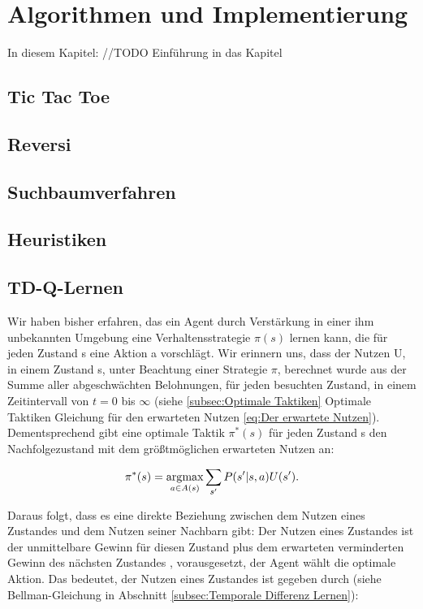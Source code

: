 \chapter{Algorithmen und Implementierung}
\label{cha:Algorithmen und Implementierung}

In diesem Kapitel: //TODO Einführung in das Kapitel

\section{Tic Tac Toe}

\section{Reversi}

\section{Suchbaumverfahren}

\section{Heuristiken}

\section{TD-Q-Lernen}

Wir haben bisher erfahren, das ein Agent durch Verstärkung in einer ihm unbekannten Umgebung eine Verhaltensstrategie $\pi(s)$ lernen kann, die für jeden Zustand s eine Aktion a vorschlägt. Wir erinnern uns, dass der Nutzen U, in einem Zustand s, unter Beachtung einer Strategie $\pi$, berechnet wurde aus der Summe aller abgeschwächten Belohnungen, für jeden besuchten Zustand, in einem Zeitintervall von $t = 0$ bis $\infty$ (siehe \ref{subsec:Optimale Taktiken} Optimale Taktiken Gleichung für den erwarteten Nutzen \ref{eq:Der erwartete Nutzen}). Dementsprechend gibt eine optimale Taktik $\pi^*(s)$ für jeden Zustand s den Nachfolgezustand mit dem größtmöglichen erwarteten Nutzen an:

\begin{equation}
\pi^*(s) = \operatorname*{arg\!\max}_{a \in A(s)} \sum_{s'} P(s'|s, a) U(s').
\end{equation}

Daraus folgt, dass es eine direkte Beziehung zwischen dem Nutzen eines Zustandes und dem Nutzen seiner Nachbarn gibt: Der Nutzen eines Zustandes ist der unmittelbare Gewinn für diesen Zustand plus dem erwarteten verminderten Gewinn des nächsten Zustandes , vorausgesetzt, der Agent wählt die optimale Aktion. Das bedeutet, der Nutzen eines Zustandes ist gegeben durch (siehe Bellman-Gleichung in Abschnitt \ref{subsec:Temporale Differenz Lernen}):

